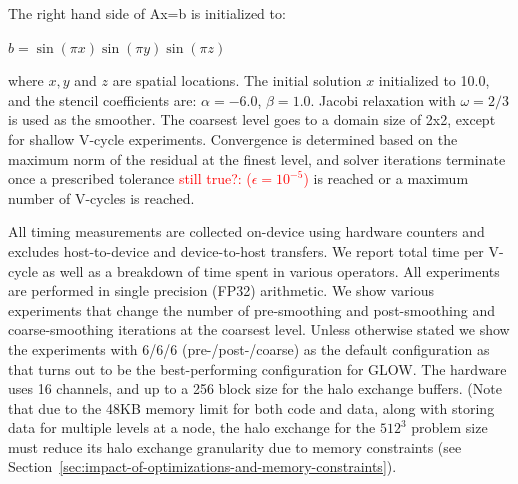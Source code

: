 \documentclass[sigconf]{acmart}
\begin{document}
The right hand side of Ax=b is initialized to: 
\begin{center}
$b=\sin(\pi x)\sin(\pi y)\sin(\pi z)$\\
\end{center}
where $x, y$ and $z$ are spatial locations.
The initial solution $x$ initialized to 10.0, and the stencil coefficients are: $\alpha = -6.0$, $\beta = 1.0$. Jacobi relaxation with $\omega=2/3$ is used as the smoother. The coarsest level goes to a domain size of 2x2, except for shallow V-cycle experiments. Convergence is determined based on the maximum norm of the residual at the finest level, and solver iterations terminate once a prescribed tolerance \textcolor{red}{still true?: ($\epsilon = 10^{-5}$)} is reached or a maximum number of V-cycles is reached. 

All timing measurements are collected on-device using hardware counters and excludes host-to-device and device-to-host transfers. We report total time per V-cycle as well as a breakdown of time spent in various operators. All experiments are performed in single precision (FP32) arithmetic. We show various experiments that change the number of pre-smoothing and post-smoothing and coarse-smoothing iterations at the coarsest level. Unless otherwise stated we show the experiments with 6/6/6 (pre-/post-/coarse) as the default configuration as that turns out to be the best-performing configuration for GLOW. The hardware uses 16 channels, and up to a 256 block size for the halo exchange buffers. (Note that due to the 48KB memory limit for both code and data, along with storing data for multiple levels at a node, the halo exchange for the $512^3$ problem size must reduce its halo exchange granularity due to memory constraints (see Section~\ref{sec:impact-of-optimizations-and-memory-constraints}).





\end{document}
